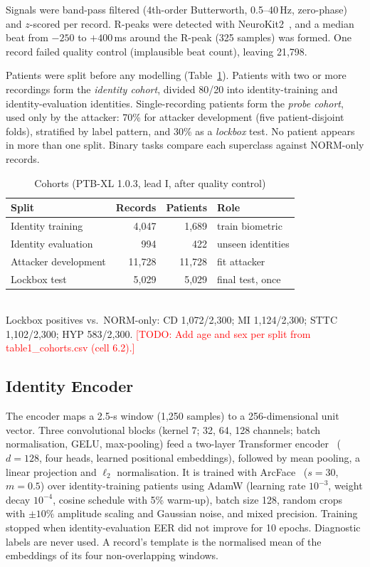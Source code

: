 \documentclass[journal]{IEEEtran}
\newcommand{\todo}[1]{\textcolor{red}{[TODO: #1]}}
\begin{document}
Signals were band-pass filtered (4th-order Butterworth, 0.5--40\,Hz, zero-phase) and $z$-scored per record. R-peaks were detected with NeuroKit2~\cite{makowski2021neurokit2}, and a median beat from $-250$ to $+400$\,ms around the R-peak (325 samples) was formed. One record failed quality control (implausible beat count), leaving 21{,}798.

Patients were split before any modelling (Table~\ref{tab:cohorts}). Patients with two or more recordings form the \emph{identity cohort}, divided 80/20 into identity-training and identity-evaluation identities. Single-recording patients form the \emph{probe cohort}, used only by the attacker: 70\% for attacker development (five patient-disjoint folds), stratified by label pattern, and 30\% as a \emph{lockbox} test. No patient appears in more than one split. Binary tasks compare each superclass against NORM-only records.

\begin{table}[!t]
\centering
\caption{Cohorts (PTB-XL 1.0.3, lead I, after quality control)}
\label{tab:cohorts}
\begin{tabular}{@{}lrrl@{}}
\toprule
Split & Records & Patients & Role \\
\midrule
Identity training & 4{,}047 & 1{,}689 & train biometric \\
Identity evaluation & 994 & 422 & unseen identities \\
Attacker development & 11{,}728 & 11{,}728 & fit attacker \\
Lockbox test & 5{,}029 & 5{,}029 & final test, once \\
\bottomrule
\end{tabular}\\[2pt]
\footnotesize Lockbox positives vs.\ NORM-only: CD 1{,}072/2{,}300; MI 1{,}124/2{,}300; STTC 1{,}102/2{,}300; HYP 583/2{,}300. \todo{Add age and sex per split from table1\_cohorts.csv (cell 6.2).}
\end{table}

\subsection{Identity Encoder}
The encoder maps a 2.5-s window (1{,}250 samples) to a 256-dimensional unit vector. Three convolutional blocks (kernel 7; 32, 64, 128 channels; batch normalisation, GELU, max-pooling) feed a two-layer Transformer encoder~\cite{vaswani2017attention} ($d=128$, four heads, learned positional embeddings), followed by mean pooling, a linear projection and $\ell_2$ normalisation. It is trained with ArcFace~\cite{deng2019arcface} ($s=30$, $m=0.5$) over identity-training patients using AdamW (learning rate $10^{-3}$, weight decay $10^{-4}$, cosine schedule with 5\% warm-up), batch size 128, random crops with $\pm10\%$ amplitude scaling and Gaussian noise, and mixed precision. Training stopped when identity-evaluation EER did not improve for 10 epochs. Diagnostic labels are never used. A record's template is the normalised mean of the embeddings of its four non-overlapping windows.
\end{document}
